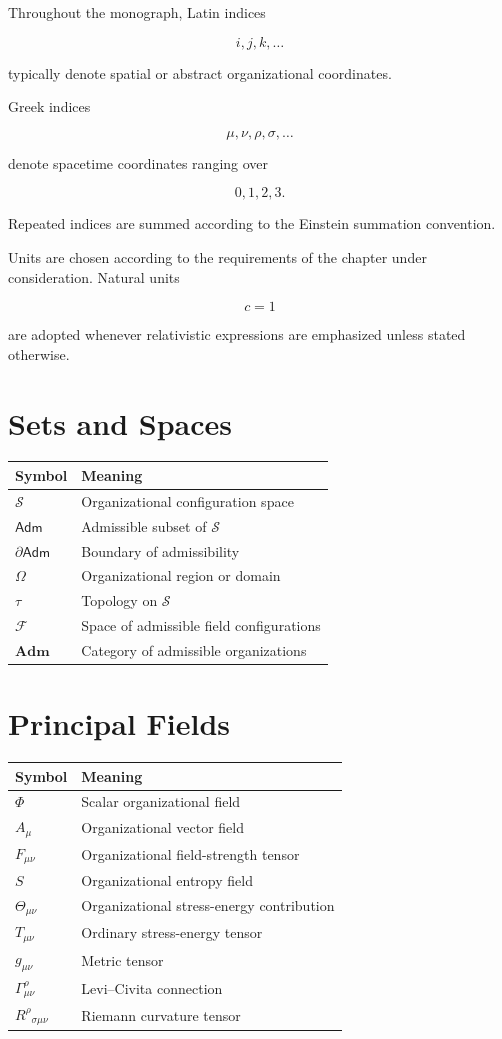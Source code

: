 \documentclass[11pt,oneside]{book}
\numberwithin{equation}{chapter}
\theoremstyle{definition}
\theoremstyle{plain}
\newcommand{\Adm}{\mathsf{Adm}}
\begin{document}
Throughout the monograph, Latin indices

\[
i,j,k,\ldots
\]

typically denote spatial or abstract organizational coordinates.

Greek indices

\[
\mu,\nu,\rho,\sigma,\ldots
\]

denote spacetime coordinates ranging over

\[
0,1,2,3.
\]

Repeated indices are summed according to the Einstein summation
convention.

Units are chosen according to the requirements of the chapter under
consideration. Natural units

\[
c=1
\]

are adopted whenever relativistic expressions are emphasized unless
stated otherwise.

\section{Sets and Spaces}

\begin{longtable}{ll}
\toprule
Symbol & Meaning\\
\midrule
$\mathcal S$ & Organizational configuration space\\
$\Adm$ & Admissible subset of $\mathcal S$\\
$\partial\Adm$ & Boundary of admissibility\\
$\Omega$ & Organizational region or domain\\
$\tau$ & Topology on $\mathcal S$\\
$\mathcal F$ & Space of admissible field configurations\\
$\mathbf{Adm}$ & Category of admissible organizations\\
\bottomrule
\end{longtable}

\section{Principal Fields}

\begin{longtable}{ll}
\toprule
Symbol & Meaning\\
\midrule
$\Phi$ & Scalar organizational field\\
$A_\mu$ & Organizational vector field\\
$F_{\mu\nu}$ & Organizational field-strength tensor\\
$S$ & Organizational entropy field\\
$\Theta_{\mu\nu}$ & Organizational stress-energy contribution\\
$T_{\mu\nu}$ & Ordinary stress-energy tensor\\
$g_{\mu\nu}$ & Metric tensor\\
$\Gamma^\rho_{\mu\nu}$ & Levi--Civita connection\\
$R^\rho{}_{\sigma\mu\nu}$ & Riemann curvature tensor\\
\bottomrule
\end{longtable}
\end{document}
